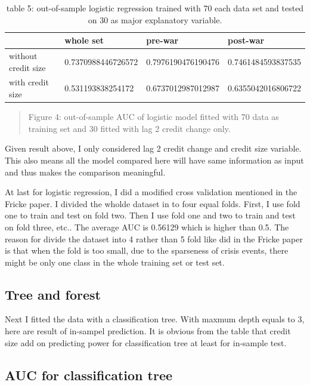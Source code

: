 \documentclass{article}
\newcommand{\ciapdf}[1]{\vspace*{-\parskip}\begin{center}\resizebox{0.75\textwidth}{!}{\texttt{[image: \#1]}}\end{center}}
\begin{document}
\begin{table}[H]
    \caption{
    table 5: out-of-sample logistic regression trained with 70%
    each data set and tested on 30%
    as major explanatory variable.
    }
    \begin{tabular}{|l|l|l|l|}
    \hline
                        & whole set          & pre-war            & post-war           \\ \hline
    without credit size & 0.7370988446726572 & 0.7976190476190476 & 0.7461484593837535 \\ \hline
    with credit size    & 0.531193838254172  & 0.6737012987012987 & 0.6355042016806722 \\ \hline
    \end{tabular}
\end{table}

\ciapdf{Figure_4.pdf}
\begin{quote}
Figure 4: out-of-sample AUC of logistic model fitted with 70%
data as training set and 30%
fitted with lag 2 credit change only.
\end{quote}

Given result above, I only considered lag 2 credit change and credit
size variable. This also means all the model compared here will have
same information as input and thus makes the comparison meaningful.

At last for logistic regression, I did a modified cross validation
mentioned in the Fricke paper. I divided the wholde dataset in to four
equal folds. First, I use fold one to train and test on fold two. Then I
use fold one and two to train and test on fold three, etc.. The average
AUC is 0.56129 which is higher than 0.5. The reason for divide the
dataset into 4 rather than 5 fold like did in the Fricke paper is that
when the fold is too small, due to the sparseness of crisis events,
there might be only one class in the whole training set or test set.

\subsection*{Tree and forest}

Next I fitted the data with a classification tree. With maxmum depth
equals to 3, here are result of in-sampel prediction. It is obvious from
the table that credit size add on predicting power for classification
tree at least for in-sample test.

\subsection*{AUC for classification tree}
\end{document}
